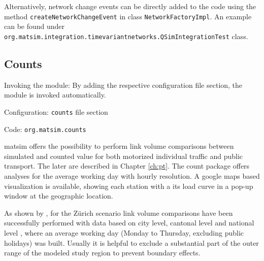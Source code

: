 Alternatively, network change events can be directly added to the code using the method \lstinline|createNetworkChangeEvent| in class \lstinline|NetworkFactoryImpl|. An example can be found under \lstinline|org.matsim.integration.timevariantnetworks.QSimIntegrationTest| class. 
%
%

\subsection{Counts}
\label{sec:counts}
\begin{compactitem}
\item Invoking the module: By adding the respective configuration file section, the module is invoked automatically.
\item Configuration: \lstinline|counts| file section
\item Code: \lstinline|org.matsim.counts|
\end{compactitem}

\gls{matsim} offers the possibility to perform link volume comparisons between simulated and counted value for both motorized individual traffic \citep{Horni_unpub_IVT_2007}  and public transport. The later are described in Chapter \ref{ch:pt}. The count package offers analyses for the average working day with hourly resolution. A google maps based visualization is available, showing each station with a its load curve in a pop-up window at the geographic location.

As shown by \citet[][]{BalmerEtAl_ResRep_bdktzrh_2009}, for the Zürich scenario link volume comparisons have been successfully performed with data based on city level, cantonal level and national level \citep[][]{ASTRA_Webpage_2006}, where an average working day (Monday to Thursday, excluding public holidays) was built. Usually it is helpful to exclude a substantial part of the outer range of the modeled study region to prevent boundary effects.

